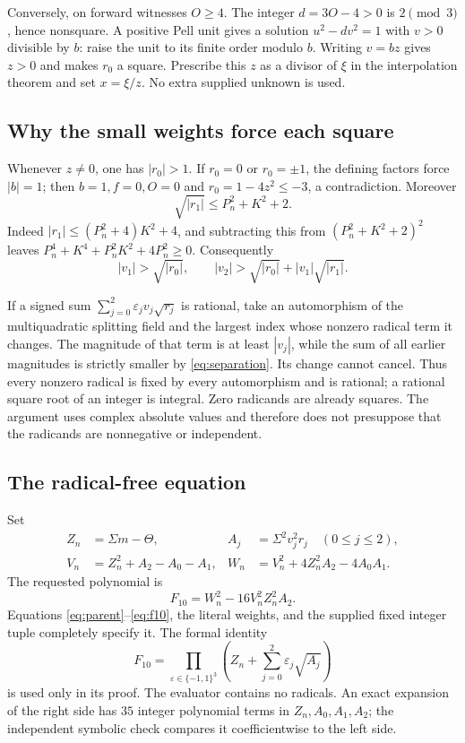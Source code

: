 \documentclass[11pt,letterpaper]{article}
\newcommand{\ep}{\varepsilon}
\theoremstyle{remark}
\begin{document}
Conversely, on forward witnesses \(O\ge4\).
The integer \(d=3O-4>0\) is \(2\pmod3\), hence nonsquare.
A positive Pell unit gives a solution \(u^2-dv^2=1\) with \(v>0\)
divisible by \(b\): raise the unit to its finite order modulo \(b\).
Writing \(v=bz\) gives \(z>0\) and makes \(r_0\) a square.
Prescribe this \(z\) as a divisor of \(\xi\) in the interpolation
theorem and set \(x=\xi/z\). No extra supplied unknown is used.

\subsection{Why the small weights force each square}

Whenever \(z\ne0\), one has \(|r_0|>1\).
If \(r_0=0\) or \(r_0=\pm1\), the defining factors force \(|b|=1\);
then \(b=1,f=0,O=0\) and \(r_0=1-4z^2\le-3\), a contradiction.
Moreover
\[
\sqrt{|r_1|}\le P_n^2+K^2+2.
\]
Indeed \(|r_1|\le(P_n^2+4)K^2+4\), and subtracting this from
\((P_n^2+K^2+2)^2\) leaves
\(P_n^4+K^4+P_n^2K^2+4P_n^2\ge0\).
Consequently
\begin{equation}
|v_1|>\sqrt{|r_0|},\qquad
|v_2|>\sqrt{|r_0|}+|v_1|\sqrt{|r_1|}.
\label{eq:separation}
\end{equation}

If a signed sum \(\sum_{j=0}^2\ep_jv_j\sqrt{r_j}\) is rational,
take an automorphism of the multiquadratic splitting field and the
largest index whose nonzero radical term it changes.
The magnitude of that term is at least \(|v_j|\), while the sum of
all earlier magnitudes is strictly smaller by \eqref{eq:separation}.
Its change cannot cancel. Thus every nonzero radical is fixed by
every automorphism and is rational; a rational square root of an
integer is integral. Zero radicands are already squares.
The argument uses complex absolute values and therefore does not
presuppose that the radicands are nonnegative or independent.

\subsection{The radical-free equation}

Set
\begin{align}
Z_n&=\Sigma m-\Theta,&
A_j&=\Sigma^2v_j^2r_j\quad(0\le j\le2),\nonumber\\
V_n&=Z_n^2+A_2-A_0-A_1,&
W_n&=V_n^2+4Z_n^2A_2-4A_0A_1.
\label{eq:norminputs}
\end{align}
The requested polynomial is
\begin{equation}
\boxed{\qquad F_{10}=W_n^2-16V_n^2Z_n^2A_2.\qquad}
\label{eq:f10}
\end{equation}
Equations \eqref{eq:parent}--\eqref{eq:f10}, the literal weights, and
the supplied fixed integer tuple completely specify it.
The formal identity
\begin{equation}
F_{10}=\prod_{\ep\in\{-1,1\}^3}
\left(Z_n+\sum_{j=0}^2\ep_j\sqrt{A_j}\right)
\label{eq:normidentity}
\end{equation}
is used only in its proof. The evaluator contains no radicals.
An exact expansion of the right side has \(35\) integer polynomial
terms in \(Z_n,A_0,A_1,A_2\); the independent symbolic check compares
it coefficientwise to the left side.
\end{document}
